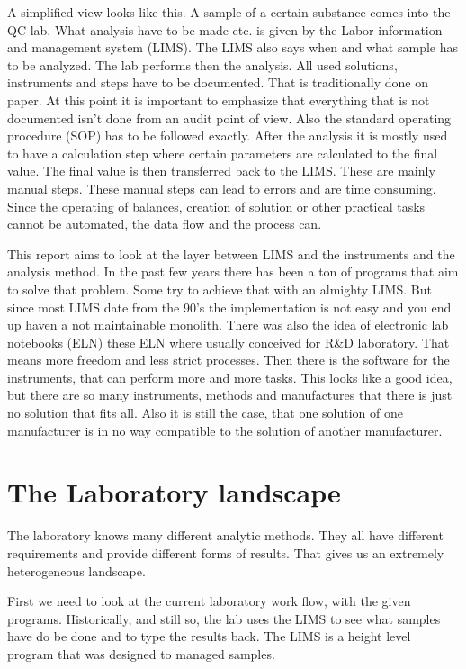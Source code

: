 \documentclass[paper=a4,twoside=false,BCOR=0mm,DIV=calc,fontsize=12pt]{scrartcl}
\begin{document}
A simplified view looks like this. A sample of a certain substance comes into the QC lab. What analysis have to be made etc. is given by the Labor information and management system (LIMS). The LIMS also says when and what sample has to be analyzed.
The lab performs then the analysis. All used solutions, instruments and steps have to be documented. That is traditionally done on paper. At this point it is important to emphasize that everything that is not documented isn't done from an audit point of view. Also the standard operating procedure (SOP) has to be followed exactly.
After the analysis it is mostly used to have a calculation step where certain parameters are calculated to the final value. The final value is then transferred back to the LIMS. These are mainly manual steps. These manual steps can lead to errors and are time consuming.
Since the operating of balances, creation of solution or other practical tasks cannot be automated, the data flow and the process can.

This report aims to look at the layer between LIMS and the instruments and the analysis method. In the past few years there has been a ton of programs that aim to solve that problem. Some try to achieve that with an almighty LIMS. But since most LIMS date from the 90's the implementation is not easy and you end up haven a not maintainable monolith. There was also the idea of electronic lab notebooks (ELN) these ELN where usually conceived for R\&D laboratory. That means more freedom and less strict processes.
Then there is the software for the instruments, that can perform more and more tasks. This looks like a good idea, but there are so many instruments, methods and manufactures that there is just no solution that fits all. Also it is still the case, that one solution of one manufacturer is in no way compatible to the solution of another manufacturer.


\section{The Laboratory landscape}
The laboratory knows many different analytic methods. They all have different requirements and provide different forms of results.
That gives us an extremely heterogeneous landscape. 



First we need to look at the current laboratory work flow, with the given programs. Historically, and still so, the lab uses the LIMS to see what samples have do be done and to type the results back. The LIMS is a height level program that was designed to managed samples.
\end{document}

